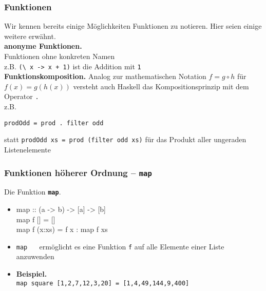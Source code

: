 \documentclass[aspectratio=1610,onlymath, ngerman]{beamer}
\renewcommand{\emph}[1]{\textbf{#1}}
\begin{document}
	\begin{frame} \frametitle{Funktionen}
	\small
		Wir kennen bereits einige Möglichkeiten Funktionen zu notieren. Hier seien einige weitere erwähnt. \\
		\bigskip
		\emph{anonyme Funktionen.} \\
		Funktionen ohne konkreten Namen \\
		z.B. \texttt{(\textbackslash \!\!\! x -> x + 1)} ist die Addition mit \texttt{1} \\
		\medskip \pause
		\emph{Funktionskomposition.}
		Analog zur mathematischen Notation $f = g \circ h$ für $f(x) = g(h(x))$ versteht auch Haskell das Kompositionsprinzip mit dem Operator \texttt{.} \\ \smallskip
		z.B. 
		\begin{center}
			\texttt{prodOdd = prod . filter odd}
		\end{center} 
		statt \texttt{prodOdd xs = prod (filter odd xs)} für das Produkt aller ungeraden Listenelemente
		
	\end{frame}
    \begin{frame}\frametitle{Funktionen höherer Ordnung -- \texttt{map}}
    \normalsize 
    	{\Large Die Funktion \emph{\texttt{map}}.} \\ \medskip
    	\begin{itemize}
    		\item 
    		\begin{ttfamily}
    			map :: (a -> b) -> [a] -> [b] \\
	    		map f [] = [] \\
	    		map f (x:xs) = f x : map f xs
    		\end{ttfamily}
    		\pause \smallskip
    		\item \texttt{map} $\quad$ ermöglicht es eine Funktion \texttt{f} auf alle Elemente einer Liste anzuwenden
    		\pause \smallskip
    		\item \emph{Beispiel.} \\
    		 \texttt{map square [1,2,7,12,3,20] = [1,4,49,144,9,400]}
    	\end{itemize}
    \end{frame}
\end{document}
